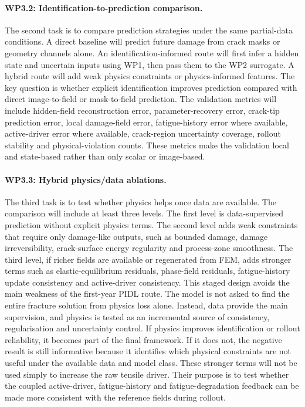 \paragraph{WP3.2: Identification-to-prediction comparison.}
The second task is to compare prediction strategies under the same partial-data conditions.
A direct baseline will predict future damage from crack masks or geometry channels alone.
An identification-informed route will first infer a hidden state and uncertain inputs using WP1, then pass them to the WP2 surrogate.
A hybrid route will add weak physics constraints or physics-informed features.
The key question is whether explicit identification improves prediction compared with direct image-to-field or mask-to-field prediction.
The validation metrics will include hidden-field reconstruction error, parameter-recovery error, crack-tip prediction error, local damage-field error, fatigue-history error where available, active-driver error where available, crack-region uncertainty coverage, rollout stability and physical-violation counts.
These metrics make the validation local and state-based rather than only scalar or image-based.

\paragraph{WP3.3: Hybrid physics/data ablations.}
The third task is to test whether physics helps once data are available.
The comparison will include at least three levels. The first level is data-supervised prediction without explicit physics terms.
The second level adds weak constraints that require only damage-like outputs, such as bounded damage, damage irreversibility, crack-surface energy regularity and process-zone smoothness.
The third level, if richer fields are available or regenerated from FEM, adds stronger terms such as elastic-equilibrium residuals, phase-field residuals, fatigue-history update consistency and active-driver consistency.
This staged design avoids the main weakness of the first-year PIDL route.
The model is not asked to find the entire fracture solution from physics loss alone.
Instead, data provide the main supervision, and physics is tested as an incremental source of consistency, regularisation and uncertainty control.
If physics improves identification or rollout reliability, it becomes part of the final framework.
If it does not, the negative result is still informative because it identifies which physical constraints are not useful under the available data and model class. These stronger terms will not be used simply to increase the raw tensile driver. Their purpose is to test whether the coupled active-driver, fatigue-history and fatigue-degradation feedback can be made more consistent with the reference fields during rollout.

